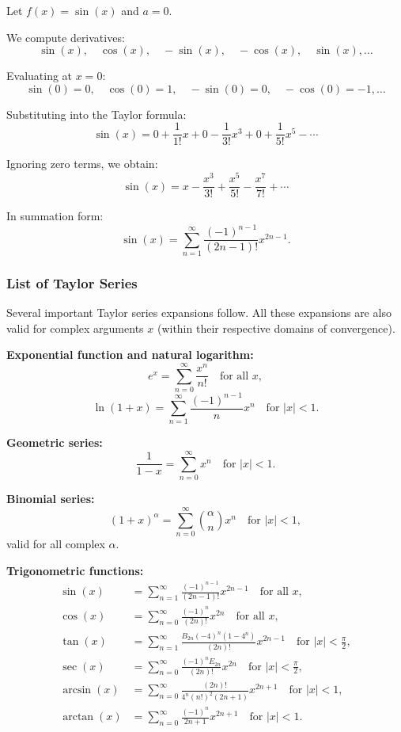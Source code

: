 Let $f(x) = \sin(x)$ and $a=0$.

We compute derivatives:
\[
\sin(x), \quad \cos(x), \quad -\sin(x), \quad -\cos(x), \quad \sin(x), \dots
\]

Evaluating at $x=0$:
\[
\sin(0)=0,\quad \cos(0)=1,\quad -\sin(0)=0,\quad -\cos(0)=-1,\dots
\]

Substituting into the Taylor formula:
\[
\sin(x) = 0 + \frac{1}{1!}x + 0 - \frac{1}{3!}x^3 + 0 + \frac{1}{5!}x^5 - \cdots
\]

Ignoring zero terms, we obtain:
\[
\sin(x) = x - \frac{x^3}{3!} + \frac{x^5}{5!} - \frac{x^7}{7!} + \cdots
\]

In summation form:
\[
\sin(x) = \sum_{n=1}^{\infty} \frac{(-1)^{n-1}}{(2n-1)!} x^{2n-1}.
\]

\subsubsection{List of Taylor Series}
\label{sss:list-782a}

Several important Taylor series expansions follow. All these expansions are also valid for complex arguments $x$ (within their respective domains of convergence).

\medskip

\textbf{Exponential function and natural logarithm:}
\[
e^x = \sum_{n=0}^{\infty} \frac{x^n}{n!}
\quad \text{for all } x,
\]
\[
\ln(1+x) = \sum_{n=1}^{\infty} \frac{(-1)^{n-1}}{n} x^n
\quad \text{for } |x| < 1.
\]

\medskip

\textbf{Geometric series:}
\[
\frac{1}{1-x} = \sum_{n=0}^{\infty} x^n
\quad \text{for } |x| < 1.
\]

\medskip

\textbf{Binomial series:}
\[
(1+x)^\alpha = \sum_{n=0}^{\infty} \binom{\alpha}{n} x^n
\quad \text{for } |x| < 1,
\]
valid for all complex $\alpha$.

\medskip

\textbf{Trigonometric functions:}
\begin{align}
\sin(x) &= \sum_{n=1}^{\infty} \frac{(-1)^{n-1}}{(2n-1)!} x^{2n-1}
\quad \text{for all } x, \\[4pt]
\cos(x) &= \sum_{n=0}^{\infty} \frac{(-1)^n}{(2n)!} x^{2n}
\quad \text{for all } x, \\[4pt]
\tan(x) &= \sum_{n=1}^{\infty} \frac{B_{2n} (-4)^n (1-4^n)}{(2n)!} x^{2n-1}
\quad \text{for } |x| < \tfrac{\pi}{2}, \\[4pt]
\sec(x) &= \sum_{n=0}^{\infty} \frac{(-1)^n E_{2n}}{(2n)!} x^{2n}
\quad \text{for } |x| < \tfrac{\pi}{2}, \\[4pt]
\arcsin(x) &= \sum_{n=0}^{\infty}
\frac{(2n)!}{4^n (n!)^2 (2n+1)} x^{2n+1}
\quad \text{for } |x| < 1, \\[4pt]
\arctan(x) &= \sum_{n=0}^{\infty}
\frac{(-1)^n}{2n+1} x^{2n+1}
\quad \text{for } |x| < 1.
\end{align}

